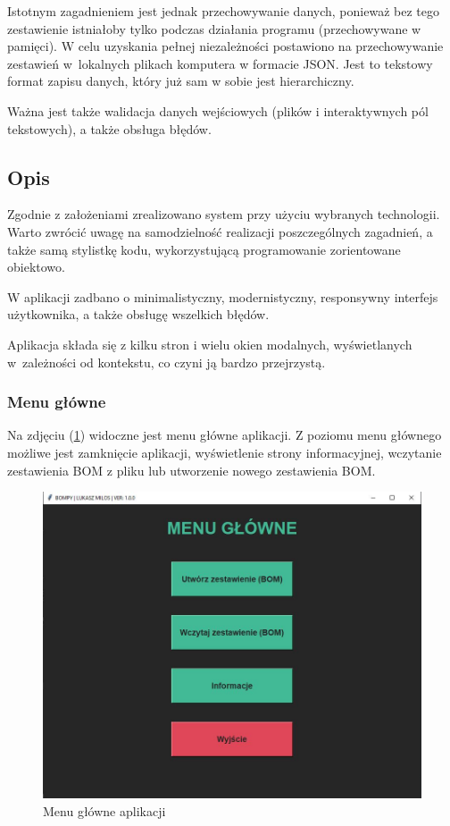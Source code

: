 \documentclass[12pt,twoside]{article}
\begin{document}
Istotnym zagadnieniem jest jednak przechowywanie danych, ponieważ bez tego zestawienie istniałoby tylko podczas działania programu (przechowywane w pamięci). W celu uzyskania pełnej niezależności postawiono na przechowywanie zestawień w~lokalnych plikach komputera w formacie JSON. Jest to tekstowy format zapisu danych, który już sam w sobie jest hierarchiczny.

Ważna jest także walidacja danych wejściowych (plików i interaktywnych pól tekstowych), a także obsługa błędów.

\subsection*{Opis}
Zgodnie z założeniami zrealizowano system przy użyciu wybranych technologii. Warto zwrócić uwagę na samodzielność realizacji poszczególnych zagadnień, a także samą stylistkę kodu, wykorzystującą programowanie zorientowane obiektowo.

W aplikacji zadbano o minimalistyczny, modernistyczny, responsywny interfejs użytkownika, a także obsługę wszelkich błędów.

Aplikacja składa się z kilku stron i wielu okien modalnych, wyświetlanych w~zależności od kontekstu, co czyni ją bardzo przejrzystą.

\subsubsection*{Menu główne}
Na zdjęciu (\ref{fig:app:menu}) widoczne jest menu główne aplikacji. Z poziomu menu głównego możliwe jest zamknięcie aplikacji, wyświetlenie strony informacyjnej, wczytanie zestawienia BOM z pliku lub utworzenie nowego zestawienia BOM.

\begin{figure}[h]
	\centering
	\includegraphics[width=\textwidth]{figures/app/menu.jpg}
	\caption{Menu główne aplikacji}
\label{fig:app:menu}
\end{figure}
\end{document}
